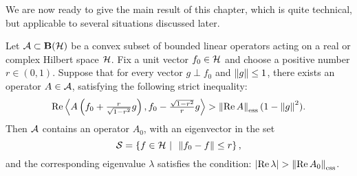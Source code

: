 We are now ready to give the main result of this chapter, which
is quite technical, but applicable to several situations
discussed later.

\smallskip

\begin{prop} \label{p:ESS}
Let ${\cal A}\subset\mathbf B(\cal H)$ be a convex subset of bounded linear
operators acting on a real or complex Hilbert space ${\cal H}$. Fix a
unit vector $f_0\in{\cal H}$ and choose a positive number
$r\in(0,1)$. Suppose that for every vector $g\perp{}f_0$ and
$\left\Vert g\right\Vert\leq1$, there exists an operator $A\in{\cal A}$, satisfying
the following strict inequality:
\begin{equation}\label{e:ESSCON}
   \RE\seq{A\left(f_0+\tfrac{r}{\sqrt{1-r^2}}g\right),
                  f_0-\tfrac{\sqrt{1-r^2}}{r}g} >
   \essnorm{\RE{}A}(1 - \norm{g}^2).
\end{equation}
Then ${\cal A}$ contains an operator $A_0$, with an eigenvector in
the set
\[ {\cal S}=\left\{f\in{\cal H}\,\,|\,\,\,\left\Vert f_0-f\right\Vert\leq{}r\right\}, \]
and the corresponding eigenvalue $\lambda$ satisfies the
condition: $\abs{\RE\lambda}>\essnorm{\RE{}A_0}$.
\end{prop}

